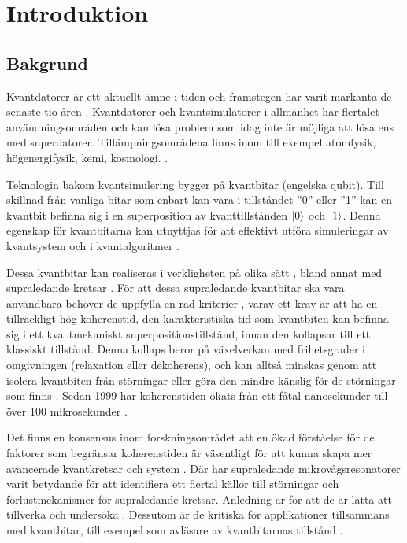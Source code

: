 \documentclass[main.tex]{subfiles}
\begin{document}
\chapter{Introduktion}
\section{Bakgrund}
Kvantdatorer är ett aktuellt ämne i tiden och framstegen har varit markanta de senaste tio åren \cite{Bylander2017}. Kvantdatorer och kvantsimulatorer i allmänhet har flertalet användningsområden och kan lösa problem som idag inte är möjliga att lösa ens med superdatorer. Tillämpningsområdena finns inom till exempel atomfysik, högenergifysik, kemi, kosmologi. \cite{applications}.

Teknologin bakom kvantsimulering bygger på kvantbitar (engelska qubit). Till skillnad från vanliga bitar som enbart kan vara i tillståndet ''0'' eller ''1'' kan en kvantbit befinna sig i en superposition av kvanttillstånden $\ket{0}$ och $\ket{1}$. Denna egenskap för kvantbitarna kan utnyttjas för att effektivt utföra simuleringar av kvantsystem och i kvantalgoritmer \cite{Eckstein2013}.

Dessa kvantbitar kan realiseras i verkligheten på olika sätt \cite{Eckstein2013}, bland annat med supraledande kretsar \cite{Oliver2013}. För att dessa supraledande kvantbitar ska vara användbara behöver de uppfylla en rad kriterier \cite{Eckstein2013}, varav ett krav är att ha en tillräckligt hög koherenstid, den karakteristiska tid som kvantbiten kan befinna sig i ett kvantmekaniskt superpositionstillstånd, innan den kollapsar till ett klassiskt tillstånd. Denna kollaps beror på växelverkan med frihetsgrader i omgivningen (relaxation eller dekoherens), och kan alltså minskas genom att isolera kvantbiten från störningar eller göra den mindre känslig för de störningar som finns \cite{Oliver2013}. Sedan 1999 har koherenstiden ökats från ett fåtal nanosekunder till över 100 mikrosekunder \cite{wendin2016}.

Det finns en konsensus inom forskningsområdet att en ökad förståelse för de faktorer som begränsar koherenstiden är väsentligt för att kunna skapa mer avancerade kvantkretsar och system \cite{Oliver2013}. Där har supraledande mikrovågsresonatorer varit betydande för att identifiera ett flertal källor till störningar och förlustmekanismer för supraledande kretsar. Anledning är för att de är lätta att tillverka och undersöka \cite{Oliver2013}. Dessutom är de kritiska för applikationer tillsammans med kvantbitar, till exempel som avläsare av kvantbitarnas tillstånd \cite{wendin2016}.
\end{document}
